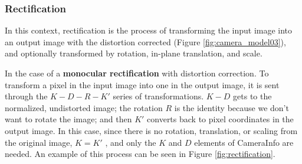 \subsubsection{Rectification}
\label{sec:rectification}
In this context, rectification is the process of transforming the input image into an output image with the distortion corrected (Figure \ref{fig:camera_model03}), and optionally transformed by rotation, in-plane translation, and scale.

In the case of a \textbf{monocular rectification} with distortion correction. To transform a pixel in the input image into one in the output image, it is sent through the $K - D - R - K'$ series of transformations. $K - D$ gets to the normalized, undistorted image; the rotation $R$ is the identity because we don't want to rotate the image; and then $K'$ converts back to pixel coordinates in the output image. In this case, since there is no rotation, translation, or scaling from the original image, $K = K'$ , and only the $K$ and $D$ elements of CameraInfo are needed.
An example of this process can be seen in Figure \ref{fig:rectification}.
